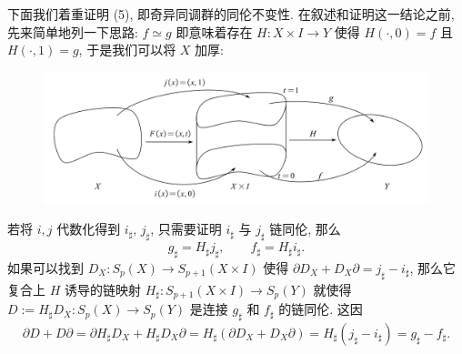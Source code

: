 下面我们着重证明 (5), 即奇异同调群的同伦不变性. 在叙述和证明这一结论之前, 先来简单地列一下思路: $ f\simeq g $ 即意味着存在 $ H : X\times I\to Y $ 使得 $ H(\cdot,0)=f $ 且 $ H(\cdot,1)=g $, 于是我们可以将 $ X $ 加厚:
\begin{figure}[htbp]
	\centering
	\includegraphics[width=0.75\linewidth]{figures/Sec10-2.png}
\end{figure}
若将 $ i,j $ 代数化得到 $ i_\sharp $, $ j_\sharp $, 只需要证明 $ i_\sharp $ 与 $ j_\sharp $ 链同伦, 那么
\[
	g_\sharp=H_\sharp j_\sharp,\qquad f_\sharp=H_\sharp i_\sharp.
\]
如果可以找到 $ D_X : S_p(X)\to S_{p+1}(X\times I) $ 使得 $ \partial D_X+D_X\partial=j_\sharp-i_\sharp $, 那么它复合上 $ H $ 诱导的链映射 $ H_\sharp : S_{p+1}(X\times I)\to S_p(Y) $ 就使得 $ D:=H_\sharp D_X : S_p(X)\to S_p(Y) $ 是连接 $ g_\sharp $ 和 $ f_\sharp $ 的链同伦. 这因
\[
	\partial D+D\partial=\partial H_\sharp D_X+H_\sharp D_X\partial=H_\sharp(\partial D_X+D_X\partial)=H_\sharp(j_\sharp-i_\sharp)=g_\sharp-f_\sharp.
\]

